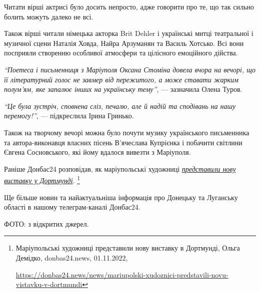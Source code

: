 Читати вірші актрисі було досить непросто, адже говорити про те, що так сильно
болить можуть далеко не всі.


Також вірші читали німецька акторка Brit Dehler і українські митці театральної
і музичної сцени Наталія Ховда, Найра Арзуманян та Василь Хотсько. Всі вони
посприяли створенню особливої атмосфери та цілісного емоційного дійства.

\begin{leftbar}
\emph{\enquote{Поетеса і письменниця з Маріуполя Оксана Стоміна довела вчора на вечорі, що її
літературний голос не завмер від пережитого, а може ставати жарким
полум'ям, яке запалює інших на українську тему}}, — зазначила Олена
Туров.
\end{leftbar}


\begin{leftbar}
\emph{\enquote{Це була зустріч, сповнена сліз, печалю, але й надій та сподівань на нашу перемогу!}}, — підкреслила Ірина Гринько.
\end{leftbar}

Також на творчому вечорі можна було почути музику українського письменника та
автора-виконавця власних пісень В'ячеслава Купрієнка і побачити світлини Євгена
Сосновського, які йому вдалося вивезти з Маріуполя.

Раніше Донбас24 розповідав, як маріупольські художниці \href{https://donbas24.news/news/mariupolski-xudoznici-predstavili-novu-vistavku-v-dortmundi}{\emph{представили нову виставку у Дортмунді}}.%
\footnote{Маріупольські художниці представили нову виставку в Дортмунді, Ольга Демідко, donbas24.news, 01.11.2022, \par\url{https://donbas24.news/news/mariupolski-xudoznici-predstavili-novu-vistavku-v-dortmundi}}

Ще більше новин та найактуальніша інформація про Донецьку та Луганську області
в нашому телеграм-каналі Донбас24.

ФОТО: з відкритих джерел.

